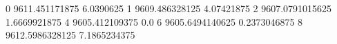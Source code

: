 0 9611.451171875 6.0390625
1 9609.486328125 4.07421875
2 9607.0791015625 1.6669921875
4 9605.412109375 0.0
6 9605.6494140625 0.2373046875
8 9612.5986328125 7.1865234375

